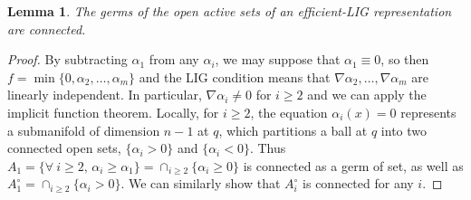 \documentclass[11pt]{article}
\newcommand{\inter}{\cap}
\newcommand{\grad}{\nabla}
\theoremstyle{plain}
\newtheorem{lem}{Lemma}
\theoremstyle{definition}
\theoremstyle{remark}
\begin{document}
	
	
	\begin{lem}
		\label{lem:connected}
		The germs of the open active sets of an efficient-LIG representation are connected.
	\end{lem}
	\begin{proof}
		By subtracting $\alpha_1$ from any $\alpha_i$, we may suppose that $\alpha_1 \equiv 0$, so then $f = \min\{0, \alpha_2, \ldots, \alpha_m\}$ and the LIG condition means that $\grad \alpha_2, \ldots, \grad \alpha_m$ are linearly independent. In particular, $\grad \alpha_i \neq 0$ for $i \geq 2$ and we can apply the implicit function theorem. Locally, for $i \geq 2$, the equation $\alpha_i(x) = 0$ represents a submanifold of dimension $n-1$ at $q$, which partitions a ball at $q$ into two connected open sets, $\{\alpha_i > 0\}$ and $\{\alpha_i < 0\}$. Thus $A_1 = \{\forall\ i \geq 2,\, \alpha_i \geq \alpha_1 \} = \inter_{i \geq 2} \{\alpha_i \geq 0\}$ is connected as a germ of set, as well as $A_1^\circ = \inter_{i \geq 2} \{\alpha_i > 0\}$. We can similarly show  that $A_i^\circ$ is connected for any $i$.
	\end{proof}
	
\end{document}
